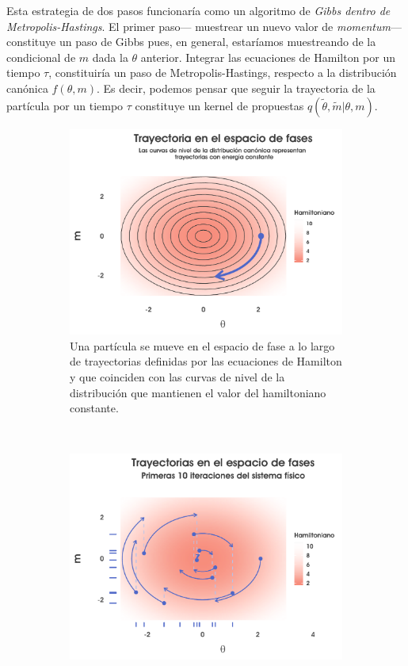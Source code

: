 Esta estrategia de dos pasos funcionaría como un algoritmo de \textit{Gibbs dentro de Metropolis-Hastings}. El primer paso--- muestrear un nuevo valor de \textit{momentum}--- constituye un paso de Gibbs pues, en general, estaríamos muestreando de la condicional de $m$ dada la $\theta$ anterior. Integrar las ecuaciones de Hamilton por un tiempo $\tau$, constituiría un paso de Metropolis-Hastings, respecto a la distribución canónica $f(\theta,m)$. Es decir, podemos pensar que seguir la trayectoria de la partícula por un tiempo $\tau$ constituye un kernel de propuestas $q(\tilde{\theta},\tilde{m}|\theta,m)$.\\ 

\begin{figure}
	\centering	
	\begin{subfigure}{0.4\textwidth}
        \includegraphics[width=\textwidth]{Figs/Bayes/Trayectoria_Espacio_Fase}
        \caption{Una partícula se mueve en el espacio de fase a lo largo de trayectorias definidas por las ecuaciones de Hamilton y que coinciden con las curvas de nivel de la distribución que mantienen el valor del hamiltoniano constante.}
        \label{fig:Primera_Trayectoria}
    \end{subfigure}
    ~ 
    \begin{subfigure}{0.4\textwidth}
        \includegraphics[width=\textwidth]{Figs/Bayes/Primeras_Trayectorias}

\end{subfigure}
\end{figure}
